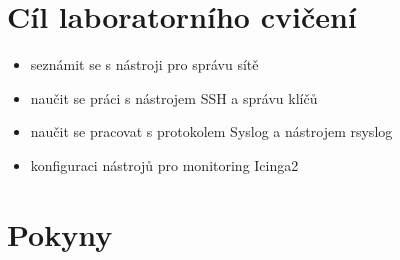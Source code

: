%
\section*{Cíl laboratorního cvičení}
\begin{itemize}
  \item seznámit se s nástroji pro správu sítě
  \item naučit se práci s nástrojem SSH a správu klíčů 
  \item naučit se pracovat s protokolem Syslog a nástrojem rsyslog
  \item konfiguraci nástrojů pro monitoring Icinga2
\end{itemize}

\section*{Pokyny}
